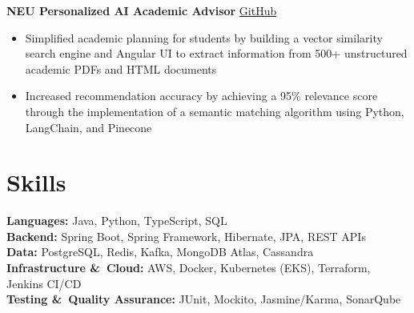 \documentclass[11pt]{article}       %
\begin{document}
\textbf{NEU Personalized AI Academic Advisor} \hfill \href{https://github.com/darshan-aswathappa/web-dev-6150-final}{GitHub} \\
\vspace{-9pt}
\begin{itemize}
  \item Simplified academic planning for students by building a vector similarity search engine and Angular UI to extract information from 500+ unstructured academic PDFs and HTML documents
  \item Increased recommendation accuracy by achieving a 95\% relevance score through the implementation of a semantic matching algorithm using Python, LangChain, and Pinecone
\end{itemize}


\vspace{-18.5pt}

\section*{Skills}
\textbf{Languages:} Java, Python, TypeScript, SQL \\
\textbf{Backend:} Spring Boot, Spring Framework, Hibernate, JPA, REST APIs \\
\textbf{Data:} PostgreSQL, Redis, Kafka, MongoDB Atlas, Cassandra \\
\textbf{Infrastructure \&\ Cloud:} AWS, Docker, Kubernetes (EKS), Terraform, Jenkins CI/CD \\
\textbf{Testing \&\ Quality Assurance:} JUnit, Mockito, Jasmine/Karma, SonarQube
\end{document}
